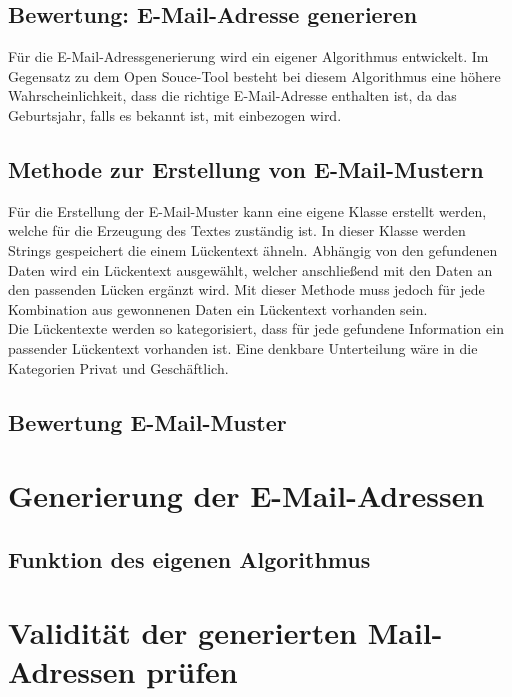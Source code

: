 	\subsection{Bewertung: E-Mail-Adresse generieren}
	
	Für die E-Mail-Adressgenerierung wird ein eigener Algorithmus entwickelt. Im Gegensatz zu dem Open Souce-Tool \cite{Bazzell} besteht bei diesem Algorithmus eine höhere Wahrscheinlichkeit, dass die richtige E-Mail-Adresse enthalten ist, da das Geburtsjahr, falls es bekannt ist, mit einbezogen wird. 
	
	\subsection{Methode zur Erstellung von E-Mail-Mustern}
	Für die Erstellung der E-Mail-Muster kann eine eigene Klasse erstellt werden, welche für die Erzeugung des Textes zuständig ist. In dieser Klasse werden Strings gespeichert die einem Lückentext ähneln. Abhängig von den gefundenen Daten wird ein Lückentext ausgewählt, welcher anschließend mit den Daten an den passenden Lücken ergänzt wird. Mit dieser Methode muss jedoch für jede Kombination aus gewonnenen Daten ein Lückentext vorhanden sein.\\
	Die Lückentexte werden so kategorisiert, dass für jede gefundene Information ein passender Lückentext vorhanden ist. Eine denkbare Unterteilung wäre in die Kategorien Privat und Geschäftlich.
	\subsection{Bewertung E-Mail-Muster}



\section{Generierung der E-Mail-Adressen}

	\subsection{Funktion des eigenen Algorithmus}
	
	
\section{Validität der generierten Mail-Adressen prüfen}

